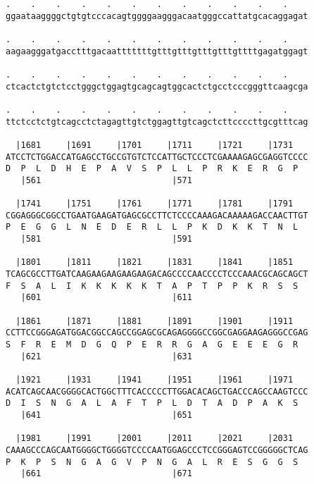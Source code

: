 \documentclass{article}
\begin{document}
\begin{Verbatim}
.    .    .    .    .    .    .    .    .    .    .    .    
ggaataaggggctgtgtcccacagtggggaagggacaatgggccattatgcacaggagat
                                                            
.    .    .    .    .    .    .    .    .    .    .    .    
aagaagggatgacctttgacaatttttttgtttgtttgtttgtttgttttgagatggagt
                                                            
.    .    .    .    .    .    .    .    .    .    .    .    
ctcactctgtctcctgggctggagtgcagcagtggcactctgcctcccgggttcaagcga
                                                            
.    .    .    .    .    .    .    .    .    .    .    .    
ttctcctctgtcagcctctagagttgtctggagttgtcagctcttccccttgcgtttcag
                                                            
  |1681     |1691     |1701     |1711     |1721     |1731   
ATCCTCTGGACCATGAGCCTGCCGTGTCTCCATTGCTCCCTCGAAAAGAGCGAGGTCCCC
D  P  L  D  H  E  P  A  V  S  P  L  L  P  R  K  E  R  G  P  
   |561                          |571                       
  
  |1741     |1751     |1761     |1771     |1781     |1791   
CGGAGGGCGGCCTGAATGAAGATGAGCGCCTTCTCCCCAAAGACAAAAAGACCAACTTGT
P  E  G  G  L  N  E  D  E  R  L  L  P  K  D  K  K  T  N  L  
   |581                          |591                       
  
  |1801     |1811     |1821     |1831     |1841     |1851   
TCAGCGCCTTGATCAAGAAGAAGAAGAAGACAGCCCCAACCCCTCCCAAACGCAGCAGCT
F  S  A  L  I  K  K  K  K  K  T  A  P  T  P  P  K  R  S  S  
   |601                          |611                       
  
  |1861     |1871     |1881     |1891     |1901     |1911   
CCTTCCGGGAGATGGACGGCCAGCCGGAGCGCAGAGGGGCCGGCGAGGAAGAGGGCCGAG
S  F  R  E  M  D  G  Q  P  E  R  R  G  A  G  E  E  E  G  R  
   |621                          |631                       
  
  |1921     |1931     |1941     |1951     |1961     |1971   
ACATCAGCAACGGGGCACTGGCTTTCACCCCCTTGGACACAGCTGACCCAGCCAAGTCCC
D  I  S  N  G  A  L  A  F  T  P  L  D  T  A  D  P  A  K  S  
   |641                          |651                       
  
  |1981     |1991     |2001     |2011     |2021     |2031   
CAAAGCCCAGCAATGGGGCTGGGGTCCCCAATGGAGCCCTCCGGGAGTCCGGGGGCTCAG
P  K  P  S  N  G  A  G  V  P  N  G  A  L  R  E  S  G  G  S  
   |661                          |671                       
  

\end{Verbatim}
\end{document}

